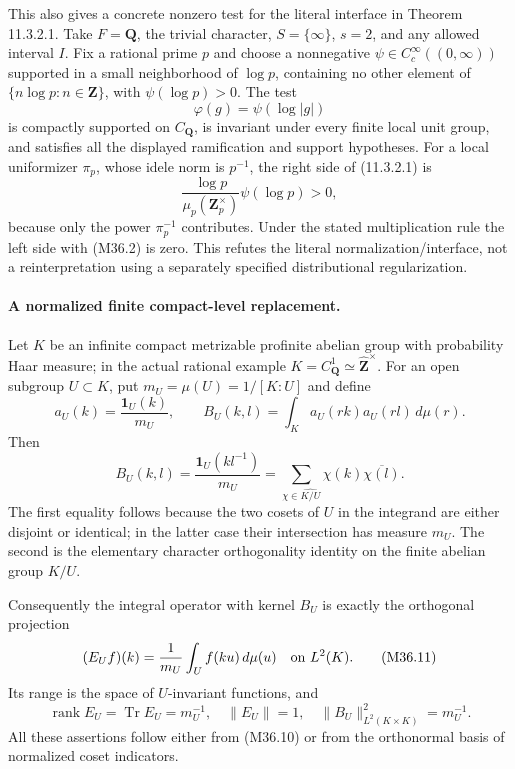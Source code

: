 This also gives a concrete nonzero test for the literal
interface in Theorem 11.3.2.1.  Take $F=\mathbf Q$,
the trivial character, $S=\{\infty\}$, $s=2$, and any
allowed interval $I$.  Fix a rational prime $p$ and
choose a nonnegative $\psi\in C_c^\infty((0,\infty))$
supported in a small neighborhood of $\log p$, containing
no other element of $\{n\log p:n\in\mathbf Z\}$, with
$\psi(\log p)>0$.  The test
\[
                             \varphi(g)=\psi(\log|g|)
 \tag{M36.7}
\]
is compactly supported on $C_{\mathbf Q}$, is invariant
under every finite local unit group, and satisfies all
the displayed ramification and support hypotheses.
For a local uniformizer $\pi_p$, whose idele norm is
$p^{-1}$, the right side of (11.3.2.1) is
\[
       \frac{\log p}{\mu_p(\mathbf Z_p^\times)}
                           \psi(\log p)>0,
 \tag{M36.8}
\]
because only the power $\pi_p^{-1}$ contributes.
Under the stated multiplication rule the left side
with (M36.2) is zero.  This refutes the literal
normalization/interface, not a reinterpretation using
a separately specified distributional regularization.

\paragraph{A normalized finite compact-level replacement.}
Let $K$ be an infinite compact metrizable profinite
abelian group with probability Haar measure; in the
actual rational example $K=C_{\mathbf Q}^1\simeq
\widehat{\mathbf Z}^\times$.  For an open subgroup
$U\subset K$, put $m_U=\mu(U)=1/[K:U]$ and define
\[
 a_U(k)=\frac{\mathbf1_U(k)}{m_U},\qquad
 B_U(k,l)=\int_Ka_U(rk)a_U(rl)\,d\mu(r).
 \tag{M36.9}
\]
Then
\[
 B_U(k,l)=\frac{\mathbf1_U(kl^{-1})}{m_U}
         =\sum_{\chi\in\widehat{K/U}}\chi(k)\overline{\chi(l)}.
 \tag{M36.10}
\]
The first equality follows because the two cosets of
$U$ in the integrand are either disjoint or identical;
in the latter case their intersection has measure $m_U$.
The second is the elementary character orthogonality
identity on the finite abelian group $K/U$.

Consequently the integral operator with kernel $B_U$
is exactly the orthogonal projection
\[
      (E_Uf)(k)=\frac1{m_U}\int_U f(ku)\,d\mu(u)
                    \quad\hbox{on }L^2(K).
 \tag{M36.11}
\]
Its range is the space of $U$-invariant functions,
and
\[
 \operatorname{rank}E_U=\operatorname{Tr}E_U=m_U^{-1},
       \quad\|E_U\|=1,\quad
       \|B_U\|_{L^2(K\times K)}^2=m_U^{-1}.
 \tag{M36.12}
\]
All these assertions follow either from (M36.10) or
from the orthonormal basis of normalized coset indicators.

